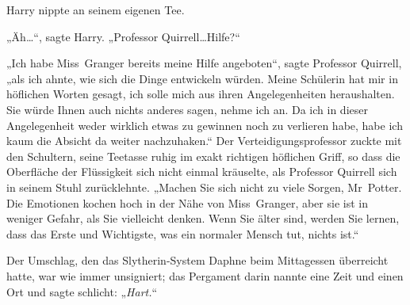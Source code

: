 Harry nippte an seinem eigenen Tee.

„Äh…“, sagte Harry. „Professor Quirrell…Hilfe?“

„Ich habe Miss~Granger bereits meine Hilfe angeboten“, sagte Professor Quirrell, „als ich ahnte, wie sich die Dinge entwickeln würden. Meine Schülerin hat mir in höflichen Worten gesagt, ich solle mich aus ihren Angelegenheiten heraushalten. Sie würde Ihnen auch nichts anderes sagen, nehme ich an. Da ich in dieser Angelegenheit weder wirklich etwas zu gewinnen noch zu verlieren habe, habe ich kaum die Absicht da weiter nachzuhaken.“ Der Verteidigungsprofessor zuckte mit den Schultern, seine Teetasse ruhig im exakt richtigen höflichen Griff, so dass die Oberfläche der Flüssigkeit sich nicht einmal kräuselte, als Professor Quirrell sich in seinem Stuhl zurücklehnte. „Machen Sie sich nicht zu viele Sorgen, Mr~Potter. Die Emotionen kochen hoch in der Nähe von Miss~Granger, aber sie ist in weniger Gefahr, als Sie vielleicht denken. Wenn Sie älter sind, werden Sie lernen, dass das Erste und Wichtigste, was ein normaler Mensch tut, nichts ist.“

\later

Der Umschlag, den das Slytherin-System Daphne beim Mittagessen überreicht hatte, war wie immer unsigniert; das Pergament darin nannte eine Zeit und einen Ort und sagte schlicht: „\emph{Hart.}“

